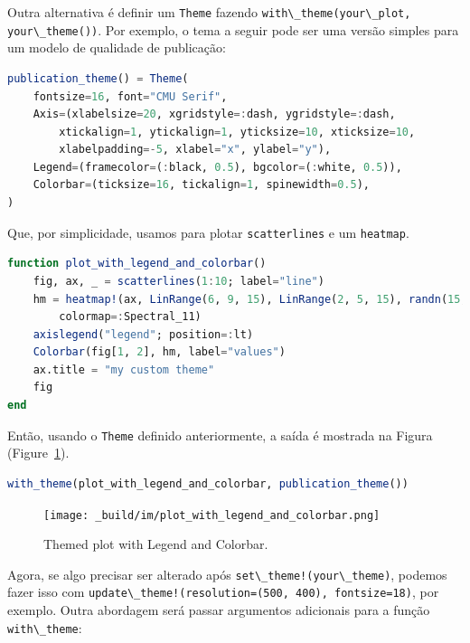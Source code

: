 \documentclass[
  notoc %
]{tufte-book}
\newcommand{\passthrough}[1]{#1}
\begin{document}
Outra alternativa é definir um \passthrough{\lstinline!Theme!} fazendo
\passthrough{\lstinline!with\_theme(your\_plot, your\_theme())!}. Por
exemplo, o tema a seguir pode ser uma versão simples para um modelo de
qualidade de publicação:

\begin{lstlisting}[language=Julia]
publication_theme() = Theme(
    fontsize=16, font="CMU Serif",
    Axis=(xlabelsize=20, xgridstyle=:dash, ygridstyle=:dash,
        xtickalign=1, ytickalign=1, yticksize=10, xticksize=10,
        xlabelpadding=-5, xlabel="x", ylabel="y"),
    Legend=(framecolor=(:black, 0.5), bgcolor=(:white, 0.5)),
    Colorbar=(ticksize=16, tickalign=1, spinewidth=0.5),
)
\end{lstlisting}

Que, por simplicidade, usamos para plotar
\passthrough{\lstinline!scatterlines!} e um
\passthrough{\lstinline!heatmap!}.

\begin{lstlisting}[language=Julia]
function plot_with_legend_and_colorbar()
    fig, ax, _ = scatterlines(1:10; label="line")
    hm = heatmap!(ax, LinRange(6, 9, 15), LinRange(2, 5, 15), randn(15, 15);
        colormap=:Spectral_11)
    axislegend("legend"; position=:lt)
    Colorbar(fig[1, 2], hm, label="values")
    ax.title = "my custom theme"
    fig
end
\end{lstlisting}

Então, usando o \passthrough{\lstinline!Theme!} definido anteriormente,
a saída é mostrada na Figura
(Figure~\ref{fig:plot_with_legend_and_colorbar}).

\begin{lstlisting}[language=Julia]
with_theme(plot_with_legend_and_colorbar, publication_theme())
\end{lstlisting}

\begin{figure}
\hypertarget{fig:plot_with_legend_and_colorbar}{%
\centering
\texttt{[image: \_build/im/plot\_with\_legend\_and\_colorbar.png]}
\caption{Themed plot with Legend and
Colorbar.}\label{fig:plot_with_legend_and_colorbar}
}
\end{figure}

Agora, se algo precisar ser alterado após
\passthrough{\lstinline"set\_theme!(your\_theme)"}, podemos fazer isso
com
\passthrough{\lstinline"update\_theme!(resolution=(500, 400), fontsize=18)"},
por exemplo. Outra abordagem será passar argumentos adicionais para a
função \passthrough{\lstinline!with\_theme!}:
\end{document}

